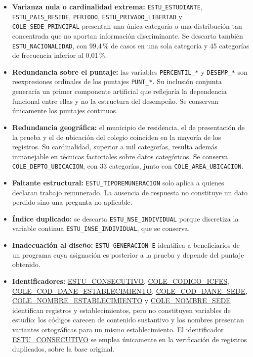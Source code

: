 \documentclass[12pt]{article}
\begin{document}
\begin{itemize}[leftmargin=1.8em, itemsep=0.4em, topsep=0.3em]
  \item \textbf{Varianza nula o cardinalidad extrema:} \texttt{ESTU\_ESTUDIANTE},
  \texttt{ESTU\_PAIS\_RESIDE}, \texttt{PERIODO}, \texttt{ESTU\_PRIVADO\_LIBERTAD}
  y \texttt{COLE\_SEDE\_PRINCIPAL} presentan una única categoría o una
  distribución tan concentrada que no aportan información discriminante.
  Se descarta también \texttt{ESTU\_NACIONALIDAD}, con 99{,}4\,\% de casos en
  una sola categoría y 45 categorías de frecuencia inferior al 0{,}01\,\%.

  \item \textbf{Redundancia sobre el puntaje:} las variables
  \texttt{PERCENTIL\_*} y \texttt{DESEMP\_*} son reexpresiones ordinales de los
  puntajes \texttt{PUNT\_*}. Su inclusión conjunta generaría un primer
  componente artificial que reflejaría la dependencia funcional entre
  ellas y no la estructura del desempeño. Se conservan únicamente los
  puntajes continuos.

  \item \textbf{Redundancia geográfica:} el municipio de residencia, el de
  presentación de la prueba y el de ubicación del colegio coinciden en la
  mayoría de los registros. Su cardinalidad, superior a mil categorías,
  resulta además inmanejable en técnicas factoriales sobre datos
  categóricos. Se conserva \texttt{COLE\_DEPTO\_UBICACION}, con 33 categorías,
  junto con \texttt{COLE\_AREA\_UBICACION}.

  \item \textbf{Faltante estructural:} \texttt{ESTU\_TIPOREMUNERACION} solo aplica
  a quienes declaran trabajo remunerado. La ausencia de respuesta no
  constituye un dato perdido sino una pregunta no aplicable.

  \item \textbf{Índice duplicado:} se descarta
  \texttt{ESTU\_NSE\_INDIVIDUAL} porque discretiza la variable continua
  \texttt{ESTU\_INSE\_INDIVIDUAL}, que se conserva.

  \item \textbf{Inadecuación al diseño:} \texttt{ESTU\_GENERACION-E} identifica a
  beneficiarios de un programa cuya asignación es posterior a la prueba y
  depende del puntaje obtenido.

  \item \textbf{Identificadores:} \url{ESTU_CONSECUTIVO},
  \url{COLE_CODIGO_ICFES}, \url{COLE_COD_DANE_ESTABLECIMIENTO},
  \url{COLE_COD_DANE_SEDE}, \url{COLE_NOMBRE_ESTABLECIMIENTO} y
  \url{COLE_NOMBRE_SEDE} identifican registros y establecimientos, pero no
  constituyen variables de estudio: los códigos carecen de contenido
  sustantivo y los nombres presentan variantes ortográficas para un mismo
  establecimiento. El identificador \url{ESTU_CONSECUTIVO} se emplea
  únicamente en la verificación de registros duplicados, sobre la base
  original.
\end{itemize}
\end{document}
